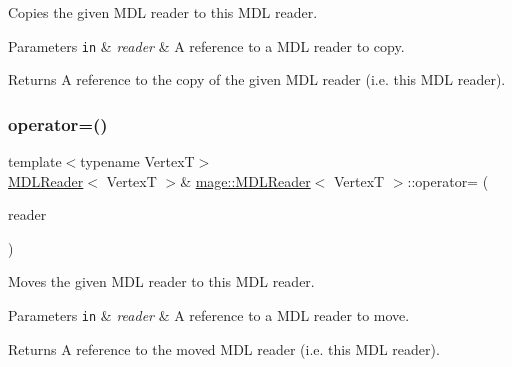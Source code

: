 Copies the given M\+DL reader to this M\+DL reader.


\begin{DoxyParams}[1]{Parameters}
\mbox{\tt in}  & {\em reader} & A reference to a M\+DL reader to copy. \\
\hline
\end{DoxyParams}
\begin{DoxyReturn}{Returns}
A reference to the copy of the given M\+DL reader (i.\+e. this M\+DL reader). 
\end{DoxyReturn}
\hypertarget{classmage_1_1_m_d_l_reader_a69770cb607b60596e6ebd96732e92938}{}\label{classmage_1_1_m_d_l_reader_a69770cb607b60596e6ebd96732e92938} 
\subsubsection{\texorpdfstring{operator=()}{operator=()}\hspace{0.1cm}{\footnotesize\ttfamily [2/2]}}
{\footnotesize\ttfamily template$<$typename VertexT$>$ \\
\hyperlink{classmage_1_1_m_d_l_reader}{M\+D\+L\+Reader}$<$ VertexT $>$\& \hyperlink{classmage_1_1_m_d_l_reader}{mage\+::\+M\+D\+L\+Reader}$<$ VertexT $>$\+::operator= (\begin{DoxyParamCaption}\item[{\hyperlink{classmage_1_1_m_d_l_reader}{M\+D\+L\+Reader}$<$ VertexT $>$ \&\&}]{reader }\end{DoxyParamCaption})\hspace{0.3cm}{\ttfamily [delete]}}

Moves the given M\+DL reader to this M\+DL reader.


\begin{DoxyParams}[1]{Parameters}
\mbox{\tt in}  & {\em reader} & A reference to a M\+DL reader to move. \\
\hline
\end{DoxyParams}
\begin{DoxyReturn}{Returns}
A reference to the moved M\+DL reader (i.\+e. this M\+DL reader). 
\end{DoxyReturn}
\hypertarget{classmage_1_1_m_d_l_reader_a8b99fb3bdea5e9dae156b135c160c22d}{}\label{classmage_1_1_m_d_l_reader_a8b99fb3bdea5e9dae156b135c160c22d} 
